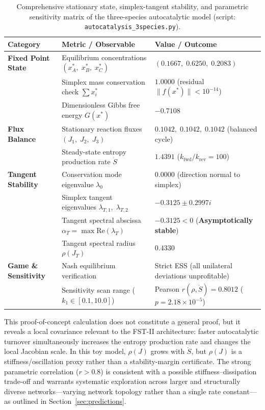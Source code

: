 \documentclass[12pt,a4paper]{article}
\theoremstyle{remark}
\begin{document}
\begin{table}[htbp]
\centering
\caption{Comprehensive stationary state, simplex-tangent stability, and parametric sensitivity matrix of the three-species autocatalytic model (script: \texttt{autocatalysis\_3species.py}).}
\label{tab:3species}
\scriptsize
\setlength{\tabcolsep}{4pt}
\begin{tabularx}{\textwidth}{@{}>{\bfseries\RaggedRight\arraybackslash}p{}>{\RaggedRight\arraybackslash}p{}>{\RaggedRight\arraybackslash}X@{}}
\toprule
\textbf{Category} & \textbf{Metric / Observable} & \textbf{Value / Outcome} \\
\midrule
\textbf{Fixed Point State} & Equilibrium concentrations $(x^*_A,\; x^*_B,\; x^*_C)$ & $(0.1667,\; 0.6250,\; 0.2083)$ \\
 & Simplex mass conservation check $\sum x_i^*$ & $1.0000$ (residual $\|f(x^*)\| < 10^{-14}$) \\
 & Dimensionless Gibbs free energy $G(x^*)$ & $-0.7108$ \\
\addlinespace
\textbf{Flux Balance} & Stationary reaction fluxes $(J_1,\; J_2,\; J_3)$ & $0.1042,\; 0.1042,\; 0.1042$ (balanced cycle) \\
 & Steady-state entropy production rate $\dot{S}$ & $1.4391$ ($k_{\text{fwd}}/k_{\text{rev}} = 100$) \\
\addlinespace
\textbf{Tangent Stability} & Conservation mode eigenvalue $\lambda_0$ & $0.0000$ (direction normal to simplex) \\
 & Simplex tangent eigenvalues $\lambda_{T,1},\; \lambda_{T,2}$ & $-0.3125 \pm 0.2997 i$ \\
 & Tangent spectral abscissa $\alpha_T = \max \mathrm{Re}(\lambda_T)$ & $-0.3125 < 0$ (\textbf{Asymptotically stable}) \\
 & Tangent spectral radius $\rho(J_T)$ & $0.4330$ \\
\addlinespace
\textbf{Game \& Sensitivity} & Nash equilibrium verification & Strict ESS (all unilateral deviations unprofitable) \\
 & Sensitivity scan range ($k_1 \in [0.1, 10.0]$) & Pearson $r(\rho, \dot{S}) = 0.8012$ ($p = 2.18 \times 10^{-5}$) \\
\bottomrule
\end{tabularx}
\end{table}

This proof-of-concept calculation does not constitute a general proof, but it reveals a local covariance relevant to the FST-II architecture: faster autocatalytic turnover simultaneously increases the entropy production rate and changes the local Jacobian scale. In this toy model, $\rho(J)$ grows with $\dot{S}$, but $\rho(J)$ is a stiffness/oscillation proxy rather than a stability-margin certificate.
The strong parametric correlation ($r>0.8$) is consistent with a possible stiffness--dissipation trade-off and warrants systematic exploration across larger and structurally diverse networks---varying network topology rather than a single rate constant---as outlined in Section~\ref{sec:predictions}.
\end{document}

